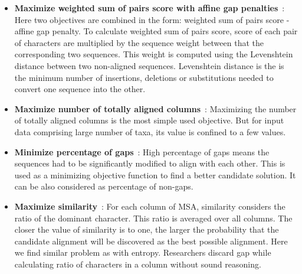 \begin{itemize}
	\item \textbf{Maximize weighted sum of pairs score with affine gap penalties}~\cite{rubio2016hybrid, rubio2016bee}:  
	Here two objectives are combined in the form: weighted sum of pairs score - affine gap penalty. To calculate weighted sum of pairs score, score of each pair of characters are multiplied by the sequence weight between that the corresponding two sequences. This weight is computed using the Levenshtein distance between two non-aligned sequences. Levenshtein distance is the is the minimum number of insertions, deletions or substitutions needed to convert one sequence into the other. 
	
	\item \textbf{Maximize number of totally aligned columns}~\cite{ortuno2013optimizing, da2010alineaga, rubio2016hybrid, rubio2016bee, ortuno2013optimizing, zambrano2017comparing}:
	Maximizing the number of totally aligned columns is the most simple used objective. But for input data comprising large number of taxa, its value is confined to a few values.
	
	\item \textbf{Minimize percentage of gaps}~\cite{abbasi2015local, ortuno2013optimizing, zambrano2017comparing}:
	High percentage of gaps means the sequences had to be significantly modified to align with each other. This is used as a minimizing objective function to find a better candidate solution. It can be also considered as percentage of non-gaps.
	
	\item \textbf{Maximize similarity}~\cite{kaya2014multiple, rani2016multiple}:
	For each column of MSA, similarity considers the ratio of the dominant character. This ratio is averaged over all columns. The closer the value of similarity is to one, the larger the probability that the candidate alignment will be discovered as the best possible alignment. Here we find similar problem as with entropy. Researchers discard gap while calculating ratio of characters in a column without sound reasoning. 
	
\end{itemize}

